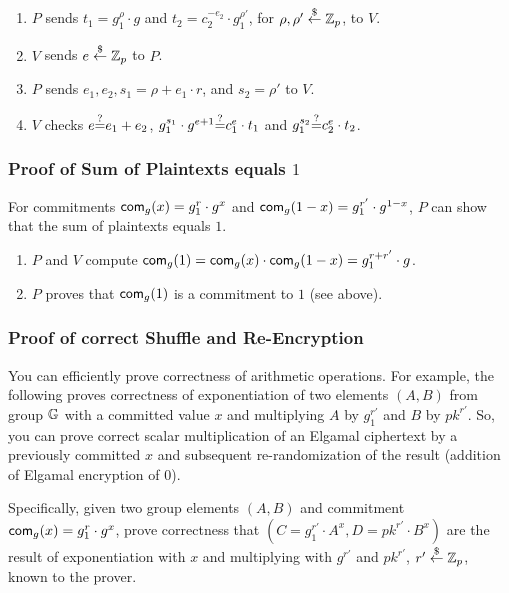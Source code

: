 \begin{enumerate}
\item $P$ sends $t_1=g_1^\rho\cdot{}g$ and
  $t_2=c_2^{-e_2}\cdot{}g_1^{\rho'}$, for $\rho,\rho'\stackrel{\$}{\leftarrow}\mathbb{Z}_p$, to
  $V$.
\item $V$ sends $e\stackrel{\$}{\leftarrow}\mathbb{Z}_p$ to $P$.
  \item $P$ sends $e_1,e_2,s_1=\rho+e_1\cdot{}r$, and $s_2=\rho'$ to $V$.

\item $V$ checks $e{\stackrel{?}{=}}{}e_1+e_2$, $g_1^{s_1}\cdot{}g^{e+1}{\stackrel{?}{=}}{}c_1^e\cdot{}t_1$ and $g_1^{s_2}{\stackrel{?}{=}}{}c_2^e\cdot{}t_2$.
\end{enumerate}



\subsubsection{Proof of Sum of Plaintexts equals $1$}
\label{pkseo}
For commitments $\mathsf{com}_{g}(x)=g_1^r\cdot{}g^x$ and
$\mathsf{com}_{g}(1-x)=g_1^{r'}\cdot{}g^{1-x}$, $P$ can show that the sum of
plaintexts equals $1$.

  \begin{enumerate}
  \item $P$ and $V$ compute
    $\mathsf{com}_{g}(1)=\mathsf{com}_{g}(x)\cdot{}\mathsf{com}_{g}(1-x)=g_1^{r+r'}\cdot{}g$.
\item $P$ proves that $\mathsf{com}_{g}(1)$ is a commitment to $1$ (see
  above).
  \end{enumerate}


  \subsubsection{Proof of correct Shuffle and Re-Encryption}
\label{pshuffle}
  You can
      efficiently prove correctness of arithmetic operations. For
      example, the following proves correctness of exponentiation of
      two elements $(A,B)$ from group $\mathbb{G}$ with a committed value $x$
      and multiplying $A$ by $g_1^{r'}$ and $B$ by $pk^{r'}$. So, you
      can prove correct scalar multiplication of an Elgamal ciphertext
      by a previously committed $x$ and subsequent re-randomization of
      the result (addition of Elgamal encryption of $0$).

      Specifically, given two group elements $(A,B)$ and commitment
      $\mathsf{com}_g(x) =g_1^{r}\cdot{}g^x$, prove correctness that
      $(C=g_1^{r'}\cdot{}A^x,D=pk^{r'}\cdot{}B^x)$ are the result of
      exponentiation with $x$ and multiplying with $g^{r'}$ and
      $pk^{r'}$, $r'\stackrel{\$}{\leftarrow}\mathbb{Z}_p$, known to the prover.

